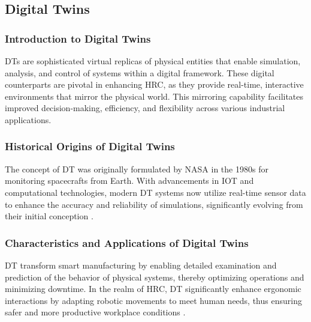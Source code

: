 



\subsection{Digital Twins}

\subsubsection{Introduction to Digital Twins}
\ac{DTs} are sophisticated virtual replicas of physical entities that enable simulation, analysis, and control of systems within a digital framework. 
These digital counterparts are pivotal in enhancing \ac{HRC}, as they provide real-time, interactive environments that mirror the physical world. 
This mirroring capability facilitates improved decision-making, efficiency, and flexibility across various industrial applications.

\subsubsection{Historical Origins of Digital Twins}
The concept of \ac{DT} was originally formulated by NASA in the 1980s for monitoring spacecrafts from Earth. With advancements in \ac{IOT} and 
computational technologies, modern \ac{DT} systems now utilize real-time sensor data to enhance the accuracy and reliability of simulations, 
significantly evolving from their initial conception \cite{liu2022digitaltwin}.

\subsubsection{Characteristics and Applications of Digital Twins}
\ac{DT} transform smart manufacturing by enabling detailed examination and prediction of the behavior of physical systems, thereby optimizing operations 
and minimizing downtime. In the realm of \ac{HRC}, \ac{DT} significantly enhance ergonomic interactions by adapting robotic movements to meet human needs,
thus ensuring safer and more productive workplace conditions \cite{8477101}.

